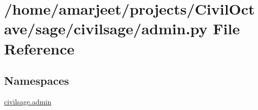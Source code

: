 \hypertarget{a00012}{}\section{/home/amarjeet/projects/\+Civil\+Octave/sage/civilsage/admin.py File Reference}
\label{a00012}
\subsection*{Namespaces}
\begin{DoxyCompactItemize}
\item 
 \hyperlink{a00032}{civilsage.\+admin}
\end{DoxyCompactItemize}
